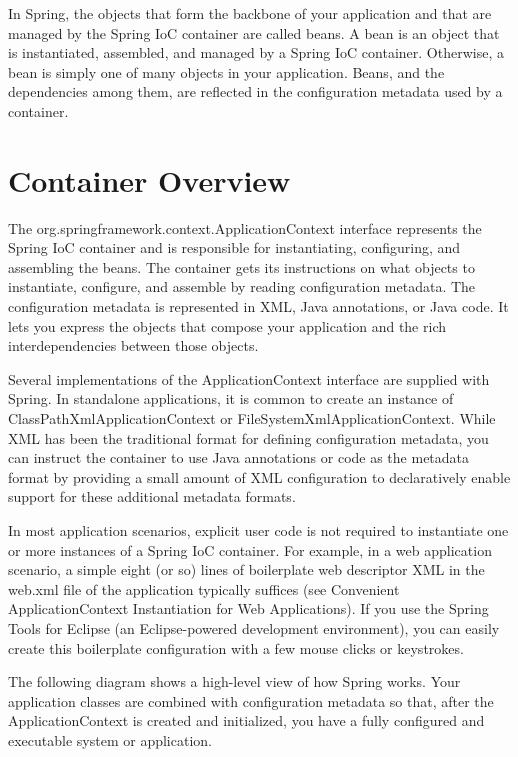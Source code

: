 In Spring, the objects that form the backbone of your application and that are managed by the
Spring IoC container are called beans. A bean is an object that is instantiated, assembled, and
managed by a Spring IoC container. Otherwise, a bean is simply one of many objects in your
application. Beans, and the dependencies among them, are reflected in the configuration metadata
used by a container.

\section{Container Overview}
The org.springframework.context.ApplicationContext interface represents the Spring IoC container
and is responsible for instantiating, configuring, and assembling the beans. The container gets its
instructions on what objects to instantiate, configure, and assemble by reading configuration
metadata. The configuration metadata is represented in XML, Java annotations, or Java code. It lets
you express the objects that compose your application and the rich interdependencies between those objects.

Several implementations of the ApplicationContext interface are supplied with Spring. In standalone applications, it is common to create an instance of ClassPathXmlApplicationContext or
FileSystemXmlApplicationContext. While XML has been the traditional format for defining
configuration metadata, you can instruct the container to use Java annotations or code as the
metadata format by providing a small amount of XML configuration to declaratively enable support
for these additional metadata formats.

In most application scenarios, explicit user code is not required to instantiate one or more
instances of a Spring IoC container. For example, in a web application scenario, a simple eight (or
so) lines of boilerplate web descriptor XML in the web.xml file of the application typically suffices
(see Convenient ApplicationContext Instantiation for Web Applications). If you use the Spring Tools
for Eclipse (an Eclipse-powered development environment), you can easily create this boilerplate
configuration with a few mouse clicks or keystrokes.

The following diagram shows a high-level view of how Spring works. Your application classes are
combined with configuration metadata so that, after the ApplicationContext is created and
initialized, you have a fully configured and executable system or application.

